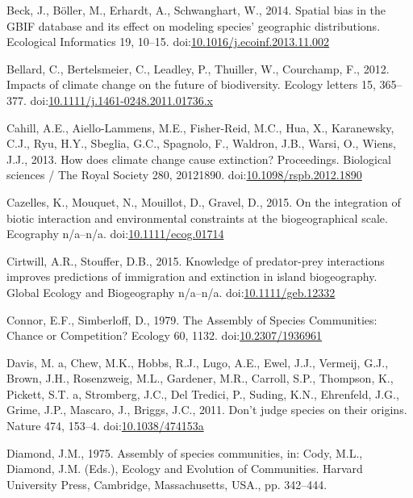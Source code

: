 \hypertarget{ref-Beck2014a}{}
Beck, J., Böller, M., Erhardt, A., Schwanghart, W., 2014. Spatial bias
in the GBIF database and its effect on modeling species' geographic
distributions. Ecological Informatics 19, 10--15.
doi:\href{https://doi.org/10.1016/j.ecoinf.2013.11.002}{10.1016/j.ecoinf.2013.11.002}

\hypertarget{ref-Bellard2012}{}
Bellard, C., Bertelsmeier, C., Leadley, P., Thuiller, W., Courchamp, F.,
2012. Impacts of climate change on the future of biodiversity. Ecology
letters 15, 365--377.
doi:\href{https://doi.org/10.1111/j.1461-0248.2011.01736.x}{10.1111/j.1461-0248.2011.01736.x}

\hypertarget{ref-Cahill2013}{}
Cahill, A.E., Aiello-Lammens, M.E., Fisher-Reid, M.C., Hua, X.,
Karanewsky, C.J., Ryu, H.Y., Sbeglia, G.C., Spagnolo, F., Waldron, J.B.,
Warsi, O., Wiens, J.J., 2013. How does climate change cause extinction?
Proceedings. Biological sciences / The Royal Society 280, 20121890.
doi:\href{https://doi.org/10.1098/rspb.2012.1890}{10.1098/rspb.2012.1890}

\hypertarget{ref-Cazelles2015b}{}
Cazelles, K., Mouquet, N., Mouillot, D., Gravel, D., 2015. On the
integration of biotic interaction and environmental constraints at the
biogeographical scale. Ecography n/a--n/a.
doi:\href{https://doi.org/10.1111/ecog.01714}{10.1111/ecog.01714}

\hypertarget{ref-Cirtwill2015}{}
Cirtwill, A.R., Stouffer, D.B., 2015. Knowledge of predator-prey
interactions improves predictions of immigration and extinction in
island biogeography. Global Ecology and Biogeography n/a--n/a.
doi:\href{https://doi.org/10.1111/geb.12332}{10.1111/geb.12332}

\hypertarget{ref-Connor1979}{}
Connor, E.F., Simberloff, D., 1979. The Assembly of Species Communities:
Chance or Competition? Ecology 60, 1132.
doi:\href{https://doi.org/10.2307/1936961}{10.2307/1936961}

\hypertarget{ref-Davis2011}{}
Davis, M. a, Chew, M.K., Hobbs, R.J., Lugo, A.E., Ewel, J.J., Vermeij,
G.J., Brown, J.H., Rosenzweig, M.L., Gardener, M.R., Carroll, S.P.,
Thompson, K., Pickett, S.T. a, Stromberg, J.C., Del Tredici, P., Suding,
K.N., Ehrenfeld, J.G., Grime, J.P., Mascaro, J., Briggs, J.C., 2011.
Don't judge species on their origins. Nature 474, 153--4.
doi:\href{https://doi.org/10.1038/474153a}{10.1038/474153a}

\hypertarget{ref-Diamond1975}{}
Diamond, J.M., 1975. Assembly of species communities, in: Cody, M.L.,
Diamond, J.M. (Eds.), Ecology and Evolution of Communities. Harvard
University Press, Cambridge, Massachusetts, USA., pp. 342--444.

